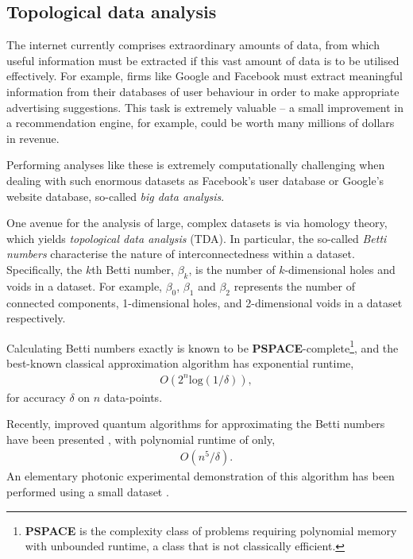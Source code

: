 %
%

\subsection{Topological data analysis} \label{sec:TDA}

The internet currently comprises extraordinary amounts of data, from which useful information must be extracted if this vast amount of data is to be utilised effectively. For example, firms like Google and Facebook must extract meaningful information from their databases of user behaviour in order to make appropriate advertising suggestions. This task is extremely valuable -- a small improvement in a recommendation engine, for example, could be worth many millions of dollars in revenue.

Performing analyses like these is extremely computationally challenging when dealing with such enormous datasets as Facebook's user database or Google's website database, so-called \textit{big data analysis}.

One avenue for the analysis of large, complex datasets is via homology theory, which yields \textit{topological data analysis} (TDA). In particular, the so-called \textit{Betti numbers} characterise the nature of interconnectedness within a dataset. Specifically, the $k$th Betti number, $\beta_k$, is the number of $k$-dimensional holes and voids in a dataset. For example, $\beta_0$, $\beta_1$ and $\beta_2$ represents the number of connected components, 1-dimensional holes, and 2-dimensional voids in a dataset respectively.

Calculating Betti numbers exactly is known to be \textbf{PSPACE}-complete\footnote{\textbf{PSPACE} is the complexity class of problems requiring polynomial memory with unbounded runtime, a class that is not classically efficient.}, and the best-known classical approximation algorithm has exponential runtime,
\begin{align}
O(2^n \mathrm{log}(1/\delta)),
\end{align}
for accuracy $\delta$ on $n$ data-points.

Recently, improved quantum algorithms for approximating the Betti numbers have been presented \cite{bib:lloyd2016quantum, bib:PhysRevLett.113.130503, bib:GiovannettiLloyd08}, with polynomial runtime of only,
\begin{align}
O(n^5/\delta).
\end{align}
An elementary photonic experimental demonstration of this algorithm has been performed using a small dataset \cite{bib:LuRohdeTDAopt}.

